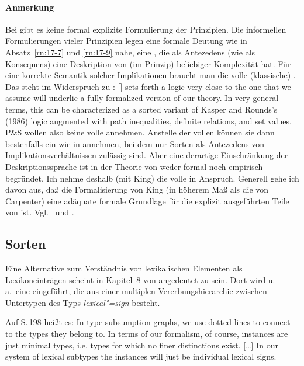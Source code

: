 \documentclass[output=paper]{LSP/langsci}
\begin{document}
\paragraph*{Anmerkung}\randnum\label{rn:17-14a} Bei \citet{PollardSag1994} gibt es keine formal explizite
Formulierung der Prinzipien. Die informellen Formulierungen vieler
Prinzipien legen eine formale Deutung wie in Absatz~\ref{rn:17-7} und \ref{rn:17-9} nahe,
\dash eine , die als Antezedens (wie als Konsequens) eine
Deskription von (im Prinzip) beliebiger Komplexität hat. Für eine
korrekte Semantik solcher Implikationen braucht man die volle
(klassische) . Das steht im Widerspruch zu \citet[8]{PollardSag1994}:
{\glqq}[\citeauthor{Carpenter92a}] sets forth a logic very close to the one that we assume
will underlie a fully formalized version of our theory. In very
general terms, this can be characterized as a sorted variant of Kasper
and Rounds's (1986) logic augmented with path inequalities, definite
relations, and set values.{\grqq} P\&S wollen also keine volle 
annehmen. Anstelle der vollen  können sie dann bestenfalls
ein  wie in \citet[228--234]{Carpenter92a} annehmen, bei dem
nur Sorten als Antezedens von Implikationsverhältnissen zulässig
sind. Aber eine derartige Einschränkung der Deskriptionssprache ist in
der Theorie von \citet{PollardSag1994} weder formal noch empirisch begründet. Ich nehme
deshalb (mit King) die volle  in Anspruch. Generell gehe
ich davon aus, daß die Formalisierung von King (in höherem Maß als die
von Carpenter) eine adäquate formale Grundlage für die explizit
ausgeführten Teile von \citet{PollardSag1992,PollardSag1994} ist. Vgl.\ \citet[§§4--5]{king1992a}
und \citet{kepser1994a}.

\subsection{Sorten}

{\randnum}Eine Alternative zum Verständnis von lexikalischen Elementen als
Lexikoneinträgen scheint in Kapitel~8 von \citet{PollardSag1987} angedeutet zu
sein. Dort wird u.\,a.\ eine  eingeführt, die aus
einer multiplen Vererbungshierarchie zwischen Untertypen des Typs
\textit{lexical"=sign} besteht.

\randnum\label{rn:17-15}Auf S.\,198 heißt es: {\glqq}In type subsumption graphs, we use dotted lines
to connect  to the types they belong to. In terms of our
formalism, of course, instances are just minimal types, i.e. types for
which no finer distinctions exist. [\ldots{}] In our system of lexical
subtypes the instances will just be individual lexical signs.{\grqq}
\end{document}
